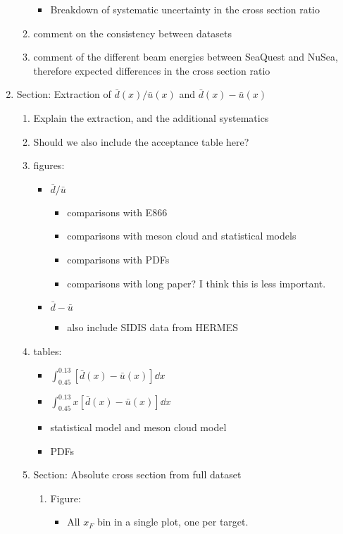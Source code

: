 \documentclass{article}
\begin{document}
\begin{enumerate}
\begin{enumerate}
\begin{itemize}
            \item Breakdown of systematic uncertainty in the cross section ratio
        \end{itemize}
        \item comment on the consistency between datasets
        \item comment of the different beam energies between SeaQuest and NuSea, therefore expected differences in the cross section ratio
    \end{enumerate}
    \item Section: Extraction of \texorpdfstring{$\bar{d}\left(x\right)/\bar{u}\left(x\right)$}{dbar(x)/ubar(x)}
	and \texorpdfstring{$\bar{d}\left(x\right)-\bar{u}\left(x\right)$}{dbar(x)-ubar(x)}
    \begin{enumerate}
        \item Explain the extraction, and the additional systematics
        \item Should we also include the acceptance table here?
        \item figures:
        \begin{itemize}
            \item $\bar{d}/\bar{u}$
            \begin{itemize}
                \item comparisons with E866
                \item comparisons with meson cloud and statistical models
                \item comparisons with PDFs
                \item comparisons with long paper? I think this is less important.
            \end{itemize}
            \item $\bar{d}-\bar{u}$
            \begin{itemize}
                \item also include SIDIS data from HERMES
            \end{itemize}
        \end{itemize}
        \item tables:
        \begin{itemize}
            \item $\int_{0.45}^{0.13} \left[\bar{d}\left(x\right) - \bar{u}\left(x\right)\right] \dd{x}$
            \item $\int_{0.45}^{0.13} x\left[\bar{d}\left(x\right) - \bar{u}\left(x\right)\right] \dd{x}$
            \item statistical model and meson cloud model
            \item PDFs
        \end{itemize}
    \item Section: Absolute cross section from full dataset
    \begin{enumerate}
        \item Figure:
        \begin{itemize}
            \item All $x_F$ bin in a single plot, one per target. 
        \end{itemize} 


\end{enumerate}
\end{enumerate}
\end{enumerate}
\end{document}
